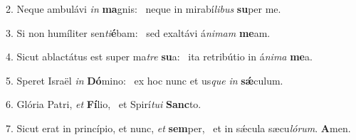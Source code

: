 2. Neque ambulávi \textit{in} \textbf{ma}gnis: \ast\  neque in mirabí\textit{li}\textit{bus} \textbf{su}per me.\

3. Si non humíliter sen\textit{ti}\textbf{é}bam: \ast\  sed exaltávi á\textit{ni}\textit{mam} \textbf{me}am.\

4. Sicut ablactátus est super ma\textit{tre} \textbf{su}a: \ast\  ita retribútio in á\textit{ni}\textit{ma} \textbf{me}a.\

5. Speret Israël \textit{in} \textbf{Dó}mino: \ast\  ex hoc nunc et us\textit{que} \textit{in} \textbf{sǽ}culum.\

6. Glória Patri, \textit{et} \textbf{Fí}lio, \ast\  et Spirí\textit{tu}\textit{i} \textbf{Sanc}to.\

7. Sicut erat in princípio, et nunc, \textit{et} \textbf{sem}per, \ast\  et in sǽcula sæcu\textit{ló}\textit{rum}. \textbf{A}men.\

